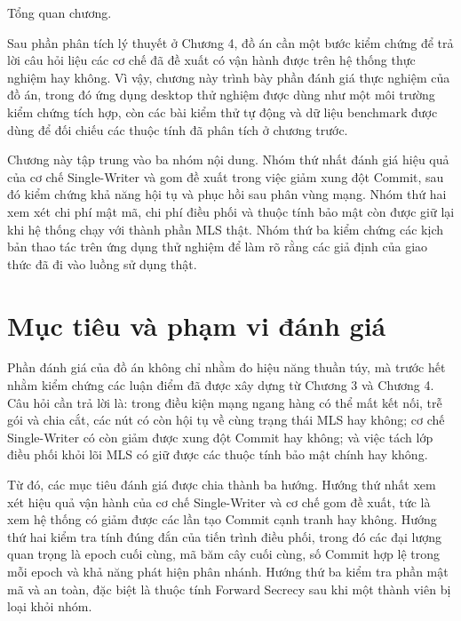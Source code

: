 \documentclass[../DoAn.tex]{subfiles}
\begin{document}
	
	Tổng quan chương.
	
Sau phần phân tích lý thuyết ở Chương 4, đồ án cần một bước kiểm chứng để trả lời câu hỏi liệu các cơ chế đã đề xuất có vận hành được trên hệ thống thực nghiệm hay không. Vì vậy, chương này trình bày phần đánh giá thực nghiệm của đồ án, trong đó ứng dụng desktop thử nghiệm được dùng như một môi trường kiểm chứng tích hợp, còn các bài kiểm thử tự động và dữ liệu benchmark được dùng để đối chiếu các thuộc tính đã phân tích ở chương trước.
	
Chương này tập trung vào ba nhóm nội dung. Nhóm thứ nhất đánh giá hiệu quả của cơ chế Single-Writer và gom đề xuất trong việc giảm xung đột Commit, sau đó kiểm chứng khả năng hội tụ và phục hồi sau phân vùng mạng. Nhóm thứ hai xem xét chi phí mật mã, chi phí điều phối và thuộc tính bảo mật còn được giữ lại khi hệ thống chạy với thành phần MLS thật. Nhóm thứ ba kiểm chứng các kịch bản thao tác trên ứng dụng thử nghiệm để làm rõ rằng các giả định của giao thức đã đi vào luồng sử dụng thật.
	
	\section{Mục tiêu và phạm vi đánh giá}
	\label{sec:muc_tieu_danh_gia}
	
Phần đánh giá của đồ án không chỉ nhằm đo hiệu năng thuần túy, mà trước hết nhằm kiểm chứng các luận điểm đã được xây dựng từ Chương 3 và Chương 4. Câu hỏi cần trả lời là: trong điều kiện mạng ngang hàng có thể mất kết nối, trễ gói và chia cắt, các nút có còn hội tụ về cùng trạng thái MLS hay không; cơ chế Single-Writer có còn giảm được xung đột Commit hay không; và việc tách lớp điều phối khỏi lõi MLS có giữ được các thuộc tính bảo mật chính hay không.
	
Từ đó, các mục tiêu đánh giá được chia thành ba hướng. Hướng thứ nhất xem xét hiệu quả vận hành của cơ chế Single-Writer và cơ chế gom đề xuất, tức là xem hệ thống có giảm được các lần tạo Commit cạnh tranh hay không. Hướng thứ hai kiểm tra tính đúng đắn của tiến trình điều phối, trong đó các đại lượng quan trọng là epoch cuối cùng, mã băm cây cuối cùng, số Commit hợp lệ trong mỗi epoch và khả năng phát hiện phân nhánh. Hướng thứ ba kiểm tra phần mật mã và an toàn, đặc biệt là thuộc tính Forward Secrecy sau khi một thành viên bị loại khỏi nhóm.
	
\end{document}
